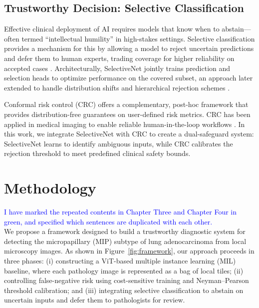 \documentclass[journal,twoside,web]{ieeecolor}
\begin{document}
\subsection{Trustworthy Decision: Selective Classification}

Effective clinical deployment of AI requires models that know when to abstain—often termed “intellectual humility” in high-stakes settings. Selective classification provides a mechanism for this by allowing a model to reject uncertain predictions and defer them to human experts, trading coverage for higher reliability on accepted cases \cite{hendrycks2016baseline, leibig2022combining}. Architecturally, SelectiveNet \cite{geifman2019selectivenet, geifman2017selective} jointly trains prediction and selection heads to optimize performance on the covered subset, an approach later extended to handle distribution shifts and hierarchical rejection schemes \cite{goren2024hierarchical}.

Conformal risk control (CRC) \cite{angelopoulos2022conformal} offers a complementary, post-hoc framework that provides distribution-free guarantees on user-defined risk metrics. CRC has been applied in medical imaging to enable reliable human-in-the-loop workflows \cite{dvijotham2023enhancing, dai2017tumor}. In this work, we integrate SelectiveNet with CRC to create a dual-safeguard system: SelectiveNet learns to identify ambiguous inputs, while CRC calibrates the rejection threshold to meet predefined clinical safety bounds.

\section{Methodology}\label{sec:methodology}
\textcolor{blue}{I have marked the repeated contents in Chapter Three and Chapter Four in green, and specified which sentences are duplicated with each other.}\\

We propose a framework designed to build a trustworthy diagnostic system for detecting the micropapillary (MIP) subtype of lung adenocarcinoma from local microscopy images. As shown in Figure~\ref{fig:framework}, our approach proceeds in three phases: (i) constructing a ViT-based multiple instance learning (MIL) baseline, where each pathology image is represented as a bag of local tiles; (ii) controlling false-negative risk using cost-sensitive training and Neyman–Pearson threshold calibration; and (iii) integrating selective classification to abstain on uncertain inputs and defer them to pathologists for review.
\end{document}
